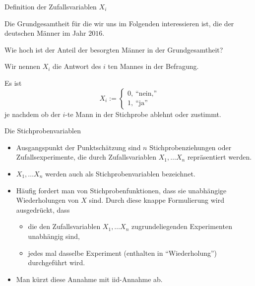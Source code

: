 \documentclass[usenames,dvipsnames,handout]{beamer}
\begin{document}
\begin{frame}{Definition der Zufallsvariablen $X_{i}$}
\begin{description}
\item{Die Grundgesamtheit für die wir uns im Folgenden interessieren ist, die der deutschen Männer im Jahr $2016.$}
\item{Wie hoch ist der Anteil der besorgten Männer in der Grundgesamtheit? }
\item{Wir nennen $X_{i}$ die Antwort  des $i$ ten Mannes in der Befragung.}
\end{description}
Es ist
     \[
     X_{i}:=\left\{\begin{array}{ll} 0, \: \text{``nein,''} \\
        1, \:  \text{``ja''}\end{array}\right. 
  \]
  je nachdem ob der $i$-te Mann in der Stichprobe ablehnt oder zustimmt.
\end{frame}

\begin{frame}{Die Stichprobenvariablen} %
\begin{itemize}
\item{Ausgangspunkt der Punktschätzung sind $n$ Stichprobenziehungen oder Zufallsexperimente, die durch Zufallsvariablen 
$X_{1}, \dots X_{n}$ repräsentiert werden.}\pause
\item{$X_{1}, \dots X_{n}$ werden auch als Stichprobenvariablen bezeichnet.}\pause
\item{Häufig fordert man von Stichprobenfunktionen, dass sie unabhängige Wiederholungen von $X$ sind. Durch diese
knappe Formulierung wird ausgedrückt, dass
\begin{itemize}
\item{die den Zufallsvariablen $X_{1}, \dots X_{n}$ zugrundeliegenden Experimenten unabhängig sind,}
\item{jedes mal dasselbe Experiment (enthalten in ``Wiederholung'') durchgeführt wird.}
\end{itemize}}\pause
\item{Man kürzt diese Annahme mit iid-Annahme ab.}
\end{itemize}
\end{frame}
\end{document}
